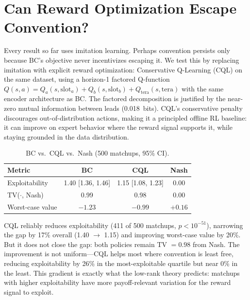 \documentclass{article}
\begin{document}
\section{Can Reward Optimization Escape Convention?}
\label{sec:cql}

Every result so far uses imitation learning. Perhaps convention persists only because BC's objective never incentivizes escaping it. We test this by replacing imitation with explicit reward optimization: Conservative Q-Learning (CQL) \citep{kumar2020conservative} on the same dataset, using a horizon-1 factored Q-function $Q(s,a) = Q_a(s,\text{slot}_a) + Q_b(s,\text{slot}_b) + Q_\text{tera}(s,\text{tera})$ with the same encoder architecture as BC. The factored decomposition is justified by the near-zero mutual information between leads (0.018~bits). CQL's conservative penalty discourages out-of-distribution actions, making it a principled offline RL baseline: it can improve on expert behavior where the reward signal supports it, while staying grounded in the data distribution.

\begin{table}[t]
\caption{BC vs.\ CQL vs.\ Nash (500 matchups, 95\% CI).}
\label{tab:cql}
\vskip 0.1in
\centering
\small
\begin{tabular}{lccc}
\toprule
Metric & BC & CQL & Nash \\
\midrule
Exploitability & 1.40 [1.36, 1.46] & 1.15 [1.08, 1.23] & 0.00 \\
TV($\cdot$, Nash) & 0.99 & 0.98 & 0.00 \\
Worst-case value & $-1.23$ & $-0.99$ & $+0.16$ \\
\bottomrule
\end{tabular}
\vskip -0.1in
\end{table}

CQL reliably reduces exploitability (411 of 500 matchups, $p < 10^{-51}$), narrowing the gap by 17\% overall (1.40 $\to$ 1.15) and improving worst-case value by 20\%. But it does not close the gap: both policies remain TV $= 0.98$ from Nash. The improvement is not uniform---CQL helps most where convention is least free, reducing exploitability by 26\% in the most-exploitable quartile but near 0\% in the least. This gradient is exactly what the low-rank theory predicts: matchups with higher exploitability have more payoff-relevant variation for the reward signal to exploit.
\end{document}
